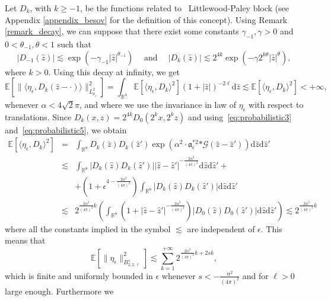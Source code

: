 \documentclass[a4paper,10pt]{article}
\newcommand{\asterisk}{\mathord{*}}
\newcommand{\mathd}{\mathrm{d}}
\newcommand{\tmop}[1]{\ensuremath{\operatorname{#1}}}
\begin{document}
Let $D_k$, with $k \geqslant - 1$, be the functions related to \
Littlewood-Paley block (see Appendix \ref{appendix_besov} for the definition
of this concept). Using Remark \ref{remark_decay}, we can suppose that there
exist some constants $\gamma_{- 1}, \gamma > 0$ and $0 < \theta_{- 1}, \theta
< 1$ such that
\[ | D_{- 1} (\hat{z}) | \lesssim \exp (- \gamma_{- 1} | \hat{z} |^{\theta_{-
   1}}) \quad \tmop{and} \quad | D_k (\hat{z}) | \lesssim 2^{4 k} \exp (-
   \gamma 2^{k \theta} | \hat{z} |^{\theta}), \]
where $k > 0$. Using this decay at infinity, we get
\[ \mathbb{E} [\| \langle \eta_{\epsilon}, D_k (\hat{z} - \cdot) \rangle
   \|_{L^2_{\rho_{\ell}}}^2] = \int_{\mathbb{R}^4} \mathbb{E} [\langle
   \eta_{\epsilon}, D_k \rangle^2] (1 + | \hat{z} |)^{- 2 \ell} \mathd \hat{z}
   \lesssim \mathbb{E} [\langle \eta_{\epsilon}, D_k \rangle^2] < + \infty, \]
whenever $\alpha < 4 \sqrt{2} \pi$, and where we use the invariance in law of
$\eta_{\epsilon}$ with respect to translations. Since $D_k (x, z) = 2^{4 k}
D_0 (2^k x, 2^k z)$ and using~{\eqref{eq:probabilistic3}}
and~{\eqref{eq:probabilistic5}}, we obtain
\begin{eqnarray}
  \mathbb{E} [\langle \eta_{\epsilon}, D_k \rangle^2] & = &
  \int_{\mathbb{R}^8} D_k (\hat{z}) D_k (\hat{z}') \exp (\alpha^2 \cdot
  \mathfrak{a}_{\epsilon}^{\asterisk 2} \asterisk \mathcal{G} (\hat{z} -
  \hat{z}')) \mathd \hat{z} \mathd \hat{z}' \nonumber\\
  & \lesssim & \int_{\mathbb{R}^8} | D_k (\hat{z}) D_k (\hat{z}') | | \hat{z}
  - \hat{z}' |^{- \frac{2 \alpha^2}{(4 \pi)^2}} \mathd \hat{z} \mathd \hat{z}'
  + \nonumber\\
  &  & + \left( 1 + \epsilon^{4 - \frac{2 \alpha^2}{(4 \pi)^2}} \right)
  \int_{\mathbb{R}^8} | D_k (\hat{z}) D_k (\hat{z}') | \mathd \hat{z} \mathd
  \hat{z}'  \nonumber\\
  & \lesssim & 2^{\frac{2 \alpha^2}{(4 \pi)^2} k} \left( \int_{\mathbb{R}^8}
  \left( 1 + | \hat{z} - \hat{z}' |^{- \frac{2 \alpha^2}{(4 \pi)^2}} \right) |
  D_0 (\hat{z}) D_0 (\hat{z}') | \mathd \hat{z} \mathd \hat{z}' \right)
  \lesssim 2^{\frac{2 \alpha^2}{(4 \pi)^2} k} \nonumber
\end{eqnarray}
where all the constants implied in the symbol $\lesssim$ are independent of
$\epsilon$. This means that
\[ \mathbb{E} [\| \eta_{\epsilon} \|^2_{B^s_{2, 2, \ell}}] \lesssim \sum^{+
   \infty}_{k = 1} 2^{\frac{2 \alpha^2}{(4 \pi)^2} k + 2 s k}, \]
which is finite and uniformly bounded in $\epsilon$ whenever $s < -
\frac{\alpha^2}{(4 \pi)^2}$ and for $\ell > 0$ large enough. Furthermore we
\end{document}
